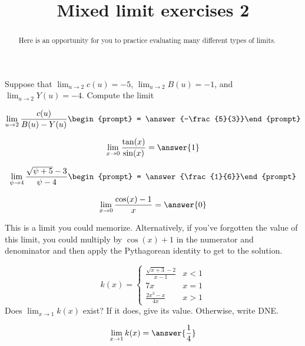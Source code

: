 \documentclass[handout]{ximera}
\title{Mixed limit exercises 2}
\begin{document}
\begin{abstract}
Here is an opportunity for you to practice evaluating many different types of limits. 
\end{abstract}
\maketitle

\begin{exercise}
Suppose that $\displaystyle\lim_{u\to2}c(u)=-5$, $\displaystyle\lim_{u\to2}B(u)=-1$, and $\displaystyle\lim_{u\to2}Y(u)=-4$. Compute the limit

\[
\lim_{u\to 2 } \frac{c(u)}{B(u)-Y(u)}\begin{prompt} = \answer{-\frac{5}{3}}\end{prompt}
\]
\end{exercise}

\begin{exercise}
\[\lim_{x \to 0} \frac{\tan(x)}{\sin(x)} = \answer{1}\]
\end{exercise}

\begin{exercise}
\[
\lim_{\psi\to 4 } \frac{\sqrt{\psi +5}-3}{\psi -4}\begin{prompt} = \answer{\frac{1}{6}}\end{prompt}
\]
\end{exercise}

\begin{exercise}
\[\lim_{x \to 0} \frac{\cos(x)-1}{x} = \answer{0}\]

\begin{hint}
This is a limit you could memorize.  Alternatively, if you've forgotten the value of this limit, you could multiply by $\cos(x)+1$ in the numerator and denominator and then apply the Pythagorean identity to get to the solution.
\end{hint}

\end{exercise}

\begin{exercise}
\[
k(x) = \begin{cases}
  \frac{\sqrt{x+3}-2}{x-1}  & x<1 \\
  7x & x=1 \\
  \frac{2x^3 -x}{4x} & x > 1
\end{cases}
\]
Does $\lim_{x \to 1} k(x)$ exist?  If it does, give its value.
Otherwise, write DNE.

\[
\lim_{x \to 1} k(x) = \answer{\frac{1}{4}}
\]
\end{exercise}
\end{document}
